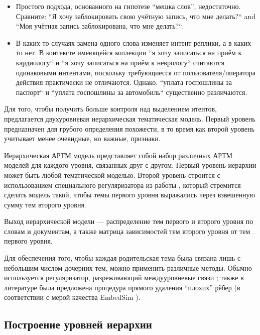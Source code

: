 \begin{itemize}
\item Простого подхода, основанного на гипотезе ``мешка слов'', недостаточно. Сравните: ``Я хочу заблокировать свою учётную запись, что мне делать?`` and ``Моя учётная запись заблокирована, что мне делать?``.

\item В каких-то случаях замена одного слова изменяет интент реплики, а в каких-то нет. В контексте имеющейся коллекции ``я хочу записаться на приём к кардиологу`` и ``я хочу записаться на приём к неврологу`` считаются одинаковыми интентами, поскольку требующиесся от пользователя/оператора действия практически не отличаются. Однако, ``уплата госпошлины за паспорт`` и ``уплата госпошлины за автомобиль`` существенно различаются.

\end{itemize}


Для того, чтобы получить больше контроля над выделением итентов, предлагается двухуровневая иерархическая тематическая модель. Первый уровень предназначен для грубого определения похожести, в то время как второй уровень учитывает менее очевидные, но важные, признаки. 

Иерархическая АРТМ модель представляет собой набор различных АРТМ моделей для каждого уровня, связанных друг с другом. Первый уровень иерархии может быть любой тематической моделью. Второй уровень строится с использованием специального регуляризатора из работы \cite{chirkova2016additive}, который стремится сделать модель такой, чтобы темы первого уровня выражались через взвешенную сумму тем второго уровня. 

Выход иерархической модели — распределение тем первого и второго уровня по словам и документам, а также матрица зависимостей тем второго уровня от тем первого уровня.

Для обеспечения того, чтобы каждая родительская тема была связана лишь с небольшим числом дочерних тем, можно применить различные методы. Обычно используется регуляризатор, разреживающий междууровневые связи \cite{chirkova2016additive} ; также в литературе была предложена процедура прямого удаления ``плохих'' рёбер (в соответствии с мерой качества EmbedSim \cite{belyy}).

\subsection{Построение уровней иерархии} \label{hierarchy_distinct}

